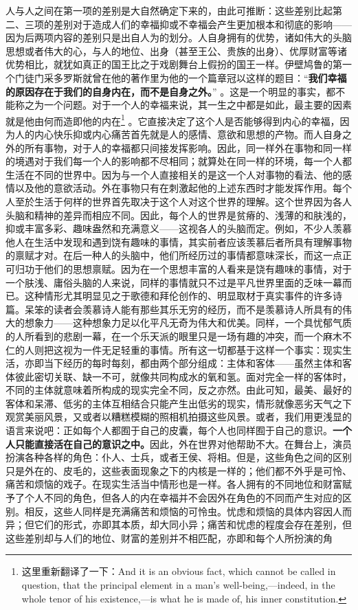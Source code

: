 \documentclass[12pt,oneside]{book}
\begin{document}
人与人之间在第一项的差别是大自然确定下来的，由此可推断：这些差别比起第二、三项的差别对于造成人们的幸福抑或不幸福会产生更加根本和彻底的影响——因为后两项内容的差别只是出自人为的划分。人自身拥有的优势，诸如伟大的头脑思想或者伟大的心，与人的地位、出身（甚至王公、贵族的出身）、优厚财富等诸优势相比，就犹如真正的国王比之于戏剧舞台上假扮的国王一样。伊壁鸠鲁的第一个门徒门采多罗斯就曾在他的著作里为他的一个篇章冠以这样的题目：“\textbf{我们幸福的原因存在于我们的自身内在，而不是自身之外。}” 。这是一个明显的事实，都不能称之为一个问题。对于一个人的幸福来说，其一生之中都是如此，最主要的因素就是他由何而造即他的内在\footnote{这里重新翻译了一下：And it is an obvious fact, which cannot be called in question, that the principal element in a man's well-being,—indeed, in the whole tenor of his existence,—is what he is made of, his inner constitution.} 。它直接决定了这个人是否能够得到内心的幸福，因为人的内心快乐抑或内心痛苦首先就是人的感情、意欲和思想的产物。而人自身之外的所有事物，对于人的幸福都只间接发挥影响。因此，同一样外在事物和同一样的境遇对于我们每一个人的影响都不尽相同；就算处在同一样的环境，每一个人都生活在不同的世界中。因为与一个人直接相关的是这一个人对事物的看法、他的感情以及他的意欲活动。外在事物只有在刺激起他的上述东西时才能发挥作用。每个人至於生活于何样的世界首先取决于这个人对这个世界的理解。这个世界因为各人头脑和精神的差异而相应不同。因此，每个人的世界是贫瘠的、浅薄的和肤浅的，抑或丰富多彩、趣味盎然和充满意义——这视各人的头脑而定。例如，不少人羡慕他人在生活中发现和遇到饶有趣味的事情，其实前者应该羡慕后者所具有理解事物的禀赋才对。在后一种人的头脑中，他们所经历过的事情都意味深长，而这一点正可归功于他们的思想禀赋。因为在一个思想丰富的人看来是饶有趣味的事情，对于一个肤浅、庸俗头脑的人来说，同样的事情就只不过是平凡世界里面的乏味一幕而已。这种情形尤其明显见之于歌德和拜伦创作的、明显取材于真实事件的许多诗篇。呆笨的读者会羡慕诗人能有那些其乐无穷的经历，而不是羡慕诗人所具有的伟大的想象力——这种想象力足以化平凡无奇为伟大和优美。同样，一个具忧郁气质的人所看到的悲剧一幕，在一个乐天派的眼里只是一场有趣的冲突，而一个麻木不仁的人则把这视为一件无足轻重的事情。所有这一切都基于这样一个事实：现实生活，亦即当下经历的每时每刻，都由两个部分组成：主体和客体——虽然主体和客体彼此密切关联、缺一不可，就像共同构成水的氧和氢。面对完全一样的客体时，不同的主体就意味着所构成的现实完全不同，反之亦然。由此可知，最美、最好的客体和呆滞、低劣的主体互相结合只能产生出低劣的现实，情形就像恶劣天气之下观赏美丽风景，又或者以糟糕模糊的照相机拍摄这些风景。或者，我们用更浅显的语言来说吧：正如每个人都囿于自己的皮囊，每个人也同样囿于自己的意识。\textbf{一个人只能直接活在自己的意识之中。}因此，外在世界对他帮助不大。在舞台上，演员扮演各种各样的角色：仆人、士兵，或者王侯、将相。但是，这些角色之间的区别只是外在的、皮毛的，这些表面现象之下的内核是一样的；他们都不外乎是可怜、痛苦和烦恼的戏子。在现实生活当中情形也是一样。各人拥有的不同地位和财富赋予了个人不同的角色，但各人的内在幸福并不会因外在角色的不同而产生对应的区别。相反，这些人同样是充满痛苦和烦恼的可怜虫。忧虑和烦恼的具体内容因人而异；但它们的形式，亦即其本质，却大同小异；痛苦和忧虑的程度会存在差别，但这些差别却与人们的地位、财富的差别并不相匹配，亦即和每个人所扮演的角
\end{document}
